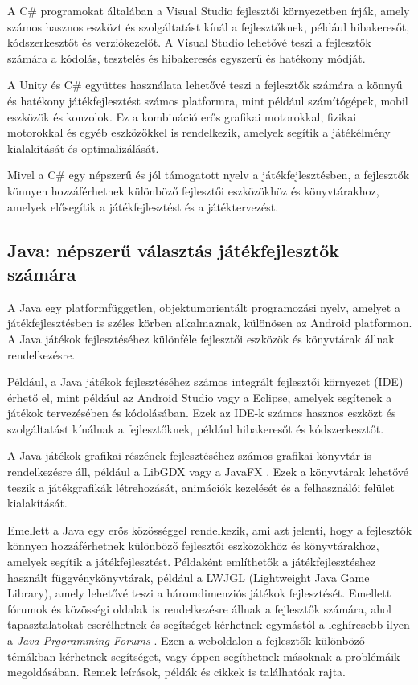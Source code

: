 A C\# programokat általában a Visual Studio\cite{vs} fejlesztői környezetben írják, amely számos hasznos eszközt és szolgáltatást kínál a fejlesztőknek, például hibakeresőt, kódszerkesztőt és verziókezelőt. A Visual Studio lehetővé teszi a fejlesztők számára a kódolás, tesztelés és hibakeresés egyszerű és hatékony módját.

A Unity és C\# együttes használata lehetővé teszi a fejlesztők számára a könnyű és hatékony játékfejlesztést számos platformra, mint például számítógépek, mobil eszközök és konzolok. Ez a kombináció erős grafikai motorokkal, fizikai motorokkal és egyéb eszközökkel is rendelkezik, amelyek segítik a játékélmény kialakítását és optimalizálását.

Mivel a C\# egy népszerű és jól támogatott nyelv a játékfejlesztésben, a fejlesztők könnyen hozzáférhetnek különböző fejlesztői eszközökhöz és könyvtárakhoz, amelyek elősegítik a játékfejlesztést és a játéktervezést.

\subsection{Java: népszerű választás játékfejlesztők számára}
 A Java\cite{java-doc, java} egy platformfüggetlen, objektumorientált programozási nyelv, amelyet a játékfejlesztésben is széles körben alkalmaznak, különösen az Android platformon. A Java játékok fejlesztéséhez különféle fejlesztői eszközök és könyvtárak állnak rendelkezésre.

Például, a Java játékok fejlesztéséhez számos integrált fejlesztői környezet (IDE) érhető el, mint például az Android Studio vagy a Eclipse, amelyek segítenek a játékok tervezésében és kódolásában. Ezek az IDE-k számos hasznos eszközt és szolgáltatást kínálnak a fejlesztőknek, például hibakeresőt és kódszerkesztőt.

A Java játékok grafikai részének fejlesztéséhez számos grafikai könyvtár is rendelkezésre áll, például a LibGDX \cite{libgdx} vagy a JavaFX \cite{javafx}. Ezek a könyvtárak lehetővé teszik a játékgrafikák létrehozását, animációk kezelését és a felhasználói felület kialakítását.

Emellett a Java egy erős közösséggel rendelkezik, ami azt jelenti, hogy a fejlesztők könnyen hozzáférhetnek különböző fejlesztői eszközökhöz és könyvtárakhoz, amelyek segítik a játékfejlesztést. Példaként említhetők a játékfejlesztéshez használt függvénykönyvtárak, például a LWJGL (Lightweight Java Game Library), amely lehetővé teszi a háromdimenziós játékok fejlesztését. Emellett fórumok és közösségi oldalak is rendelkezésre állnak a fejlesztők számára, ahol tapasztalatokat cserélhetnek és segítséget kérhetnek egymástól a leghíresebb ilyen a \textsl{Java Prgoramming Forums} \cite{JPF}. Ezen a weboldalon a fejlesztők különböző témákban kérhetnek segítséget, vagy éppen segíthetnek másoknak a problémáik megoldásában. Remek leírások, példák és cikkek is találhatóak rajta.

